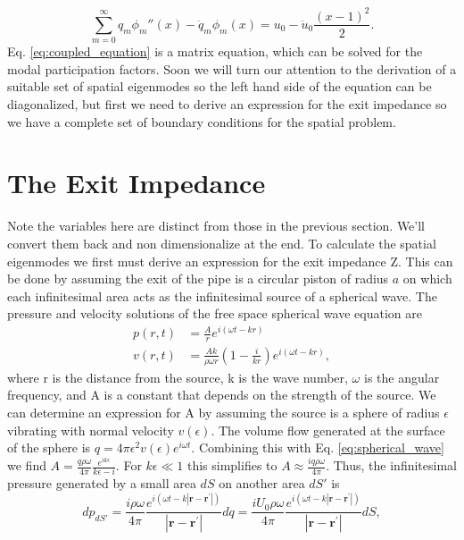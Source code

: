 \documentclass[superscriptaddress, onecolumn, prl]{revtex4}
\begin{document}
\begin{equation}
\label{eq:coupled_equation}
\sum_{m=0}^\infty q_m \phi_m''(x) - \ddot{q}_m \phi_m(x) = u_0 - \ddot{u}_0 \frac{(x-1)^2}{2}.
\end{equation}
Eq. \ref{eq:coupled_equation} is a matrix equation, which can be solved for the modal participation factors. Soon we will turn our attention to the derivation of a suitable set of spatial eigenmodes so the left hand side of the equation can be diagonalized, but first we need to derive an expression for the exit impedance so we have a complete set of boundary conditions for the spatial problem. 

\section{The Exit Impedance}
Note the variables here are distinct from those in the previous section. We'll convert them back and non dimensionalize at the end. To calculate the spatial eigenmodes we first must derive an expression for the exit impedance Z. This can be done by assuming the exit of the pipe is a circular piston of radius $a$ on which each infinitesimal area acts as the infinitesimal source of a spherical wave. The pressure and velocity solutions of the free space spherical wave equation are
\begin{equation}
\label{eq:spherical_wave}
\begin{split}
p(r,t) &= \frac{A}{r} e^{i(\omega t-kr)} \\ v(r,t) &= \frac{Ak}{\rho \omega r} \left( 1 - \frac{i}{kr} \right)e^{i(\omega t-kr)},
\end{split}
\end{equation}
where r is the distance from the source, k is the wave number, $\omega$ is the angular frequency, and A is a constant that depends on the strength of the source. We can determine an expression for A by assuming the source is a sphere of radius $\epsilon$ vibrating with normal velocity $v(\epsilon)$. The volume flow generated at the surface of the sphere is $q = 4 \pi \epsilon^2 v(\epsilon) e^{i \omega t}$. Combining this with Eq. \ref{eq:spherical_wave} we find $A=\frac{q \rho \omega}{4 \pi} \frac{e^{ik\epsilon}}{k\epsilon-i}$. For $k\epsilon \ll 1$ this simplifies to $A \approx \frac{i q \rho \omega}{4 \pi}$. Thus, the infinitesimal pressure generated by a small area $dS$ on another area $dS'$ is
\begin{equation}
\label{eq:dp_at_ds_prime}
dp_{dS'} = \frac{i \rho \omega}{4 \pi} \frac{e^{i(\omega t-k|\textbf{r}-\textbf{r}^\prime|)}}{|\textbf{r}-\textbf{r}^\prime|} dq = \frac{i U_0 \rho \omega}{4 \pi} \frac{e^{i(\omega t-k|\textbf{r}-\textbf{r}^\prime|)}}{|\textbf{r}-\textbf{r}^\prime|} dS,
\end{equation}  
\end{document}

